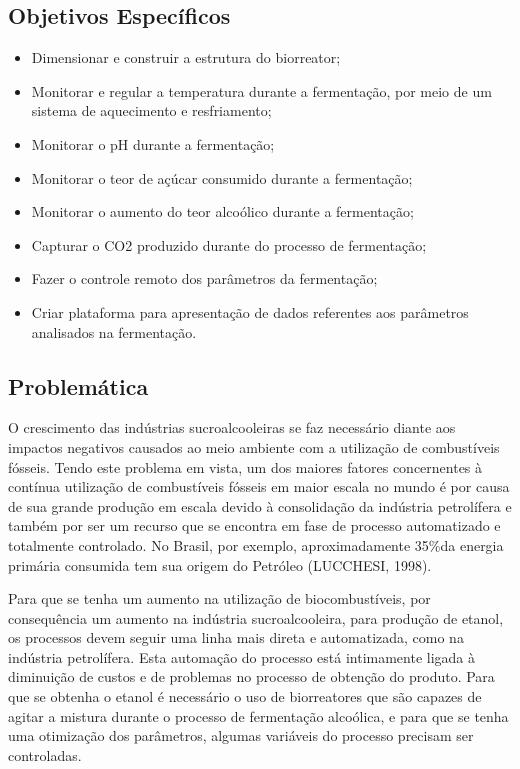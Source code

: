 \subsection{Objetivos Específicos}

\begin{itemize}
	\item Dimensionar e construir a estrutura do biorreator;
	\item Monitorar e regular a temperatura durante a fermentação, por meio de um sistema de aquecimento e resfriamento;
	\item Monitorar o pH durante a fermentação;
	\item Monitorar o teor de açúcar consumido durante a fermentação;
	\item Monitorar o aumento do teor alcoólico durante a fermentação;
	\item Capturar o CO2 produzido durante do processo de fermentação;
	\item Fazer o controle remoto dos parâmetros da fermentação;
	\item Criar plataforma para apresentação de dados referentes aos parâmetros analisados na fermentação.
\end{itemize}

\subsection{Problemática}

O crescimento das indústrias sucroalcooleiras se faz necessário diante aos impactos negativos causados ao meio ambiente com a utilização de combustíveis fósseis. Tendo este problema em vista, um dos maiores fatores concernentes à contínua utilização de combustíveis fósseis em maior escala no mundo é por causa de sua grande produção em escala devido à consolidação da indústria petrolífera e também por ser um recurso que se encontra em fase de processo automatizado e totalmente controlado. No Brasil, por exemplo, aproximadamente 35\%da energia primária consumida tem sua origem do Petróleo (LUCCHESI, 1998).

Para que se tenha um aumento na utilização de biocombustíveis, por consequência um aumento na indústria sucroalcooleira, para produção de etanol, os processos devem seguir uma linha mais direta e automatizada, como na indústria petrolífera. Esta automação do processo está intimamente ligada à diminuição de custos e de problemas no processo de obtenção do produto. Para que se obtenha o etanol é necessário o uso de biorreatores que são capazes de agitar a mistura durante o processo de fermentação alcoólica, e para que se tenha uma otimização dos parâmetros, algumas variáveis do processo precisam ser controladas.

